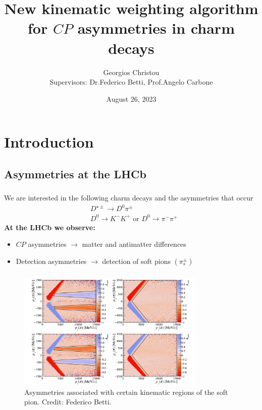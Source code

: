 \documentclass{beamer}
\title[\href{https://summerstudent.web.cern.ch/home}{CERN Summer Student Programme 2023}]
{     
      New kinematic weighting algorithm for $CP$ asymmetries in charm decays
}
\author[\href{https://github.com/GiorgosChr}{Georgios Christou}]
{Georgios Christou
\\
Supervisors: Dr.\@ Federico Betti, Prof.\@ Angelo Carbone}
\institute[]
{
      LHCb Collaboration
}
\date{August 26, 2023}
\begin{document}
\frame{\titlepage}
\begin{frame}
      \tableofcontents
\end{frame}

\section{Introduction}
\subsection{Asymmetries at the LHCb}


\begin{frame}
      \frametitle{\insertsubsectionhead}
      We are interested in the following charm decays and the asymmetries that occur
      \begin{eqnarray*}
            & D^{\star \pm} \to D^0 \pi^{\pm} \nonumber\\
            &D^0\to K^-K^+ \text{ or } D^0\to \pi^-\pi^+
      \end{eqnarray*}
      \textbf{At the LHCb we observe:}
      \begin{itemize}
            \item $CP$ asymmetries $\rightarrow$ matter and antimatter differences
            \item Detection asymmetries $\rightarrow$ detection of soft pions $(\pi^\pm_s)$
      \end{itemize}
\end{frame}

\begin{frame}
      \frametitle{\insertsubsectionhead}
      \begin{figure}
            \centering
            \includegraphics[width = 0.8\textwidth]{Figures/FedericoPlot.png}
            \caption{Asymmetries associated with certain kinematic regions of the soft pion. Credit: Federico Betti.}
      \end{figure}
\end{frame}
\end{document}
